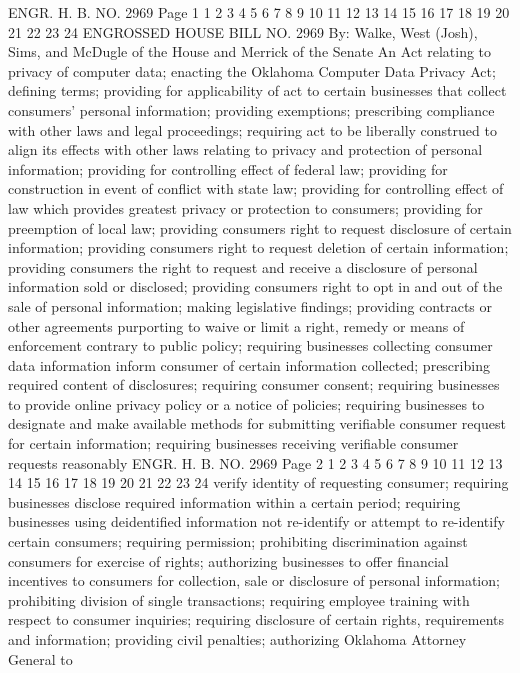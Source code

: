 ENGR. H. B. NO. 2969 Page 1
1
2
3
4
5
6
7
8
9
10
11
12
13
14
15
16
17
18
19
20
21
22
23
24
ENGROSSED HOUSE
BILL NO. 2969 By: Walke, West (Josh), Sims,
and McDugle of the House
and
Merrick of the Senate
An Act relating to privacy of computer data; enacting
the Oklahoma Computer Data Privacy Act; defining
terms; providing for applicability of act to certain
businesses that collect consumers' personal
information; providing exemptions; prescribing
compliance with other laws and legal proceedings;
requiring act to be liberally construed to align its
effects with other laws relating to privacy and
protection of personal information; providing for
controlling effect of federal law; providing for
construction in event of conflict with state law;
providing for controlling effect of law which
provides greatest privacy or protection to consumers;
providing for preemption of local law; providing
consumers right to request disclosure of certain
information; providing consumers right to request
deletion of certain information; providing consumers
the right to request and receive a disclosure of
personal information sold or disclosed; providing
consumers right to opt in and out of the sale of
personal information; making legislative findings;
providing contracts or other agreements purporting to
waive or limit a right, remedy or means of
enforcement contrary to public policy; requiring
businesses collecting consumer data information
inform consumer of certain information collected;
prescribing required content of disclosures;
requiring consumer consent; requiring businesses to
provide online privacy policy or a notice of
policies; requiring businesses to designate and make
available methods for submitting verifiable consumer
request for certain information; requiring businesses
receiving verifiable consumer requests reasonably
ENGR. H. B. NO. 2969 Page 2
1
2
3
4
5
6
7
8
9
10
11
12
13
14
15
16
17
18
19
20
21
22
23
24
verify identity of requesting consumer; requiring
businesses disclose required information within a
certain period; requiring businesses using deidentified information not re-identify or attempt to
re-identify certain consumers; requiring permission;
prohibiting discrimination against consumers for
exercise of rights; authorizing businesses to offer
financial incentives to consumers for collection,
sale or disclosure of personal information;
prohibiting division of single transactions;
requiring employee training with respect to consumer
inquiries; requiring disclosure of certain rights,
requirements and information; providing civil
penalties; authorizing Oklahoma Attorney General to
